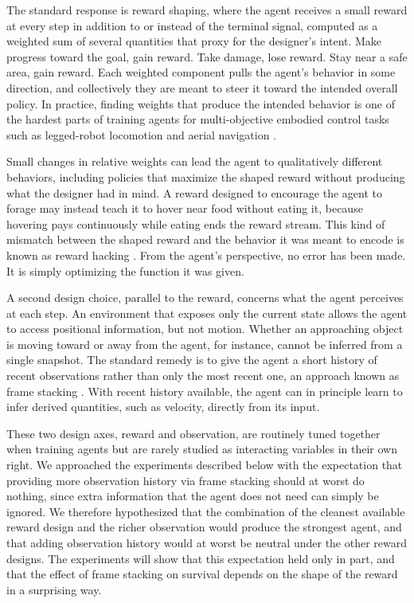 \documentclass[12pt,a4paper,titlepage]{article}
\begin{document}
The standard response is reward shaping, where the agent receives a small reward at every step in addition to or instead of the terminal signal, computed as a weighted sum of several quantities that proxy for the designer's intent. Make progress toward the goal, gain reward. Take damage, lose reward. Stay near a safe area, gain reward. Each weighted component pulls the agent's behavior in some direction, and collectively they are meant to steer it toward the intended overall policy. In practice, finding weights that produce the intended behavior is one of the hardest parts of training agents for multi-objective embodied control tasks such as legged-robot locomotion and aerial navigation \citep{Hwangbo2019, Hwangbo2017}.

Small changes in relative weights can lead the agent to qualitatively different behaviors, including policies that maximize the shaped reward without producing what the designer had in mind. A reward designed to encourage the agent to forage may instead teach it to hover near food without eating it, because hovering pays continuously while eating ends the reward stream. This kind of mismatch between the shaped reward and the behavior it was meant to encode is known as reward hacking \citep{Amodei2016}. From the agent's perspective, no error has been made. It is simply optimizing the function it was given.

A second design choice, parallel to the reward, concerns what the agent perceives at each step. An environment that exposes only the current state allows the agent to access positional information, but not motion. Whether an approaching object is moving toward or away from the agent, for instance, cannot be inferred from a single snapshot. The standard remedy is to give the agent a short history of recent observations rather than only the most recent one, an approach known as frame stacking \citep{Mnih2013}. With recent history available, the agent can in principle learn to infer derived quantities, such as velocity, directly from its input.

These two design axes, reward and observation, are routinely tuned together when training agents but are rarely studied as interacting variables in their own right. We approached the experiments described below with the expectation that providing more observation history via frame stacking should at worst do nothing, since extra information that the agent does not need can simply be ignored. We therefore hypothesized that the combination of the cleanest available reward design and the richer observation would produce the strongest agent, and that adding observation history would at worst be neutral under the other reward designs. The experiments will show that this expectation held only in part, and that the effect of frame stacking on survival depends on the shape of the reward in a surprising way.
\end{document}
